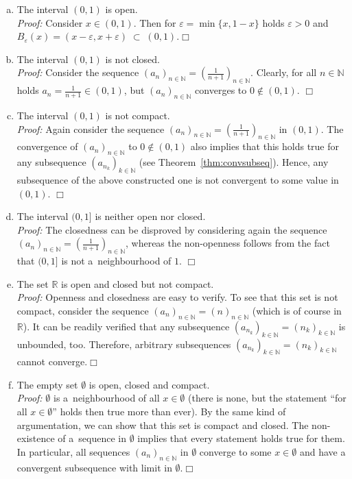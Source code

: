 \begin{example}
 \begin{enumerate}[(a)]
\item The interval $(0,1)$ is open. \\
{\em Proof:} Consider $x\in(0,1)$. Then for $\varepsilon=\min\{x,1-x\}$ holds $\varepsilon>0$ and \linebreak$B_\varepsilon(x)=(x-\varepsilon,x+\varepsilon)\;\subset\;(0,1)$.\hfill$\Box$
\item The interval $(0,1)$ is not closed.\\
{\em Proof:} Consider the sequence $(a_n)_{n\in\mathbb{N}}=(\frac1{n+1})_{n\in\mathbb{N}}$. Clearly, for all $n\in\mathbb{N}$ holds $a_n=\frac1{n+1}\in(0,1)$, but $(a_n)_{n\in\mathbb{N}}$ converges to $0\notin(0,1)$.
\hfill$\Box$
\item The interval $(0,1)$ is not compact.\\
{\em Proof:} Again consider the sequence $(a_n)_{n\in\mathbb{N}}=(\frac1{n+1})_{n\in\mathbb{N}}$ in $(0,1)$. The convergence of $(a_n)_{n\in\mathbb{N}}$ to $0\notin(0,1)$ also implies that this holds true for any subsequence $(a_{n_k})_{k\in\mathbb{N}}$ (see Theorem~\ref{thm:convsubseq}). Hence, any subsequence of the above constructed one is not convergent to some value in $(0,1)$.
\hfill$\Box$
\item The interval $(0,1]$ is neither open nor closed.\\
{\em Proof:} The closedness can be disproved by considering again the sequence \linebreak$(a_n)_{n\in\mathbb{N}}=(\frac1{n+1})_{n\in\mathbb{N}}$, whereas the non-openness follows from the fact that $(0,1]$ is not a~neighbourhood of $1$.
\hfill$\Box$
\item The set $\mathbb{R}$ is open and closed but not compact.\\
{\em Proof:} Openness and closedness are easy to verify. To see that this set is not compact, consider the sequence $(a_n)_{n\in\mathbb{N}}=(n)_{n\in\mathbb{N}}$ (which is of course in $\mathbb{R}$). It can be readily verified that any subsequence $(a_{n_k})_{k\in\mathbb{N}}=(n_k)_{k\in\mathbb{N}}$ is unbounded, too. Therefore, arbitrary subsequences $(a_{n_k})_{k\in\mathbb{N}}=(n_k)_{k\in\mathbb{N}}$ cannot converge.\hfill$\Box$
\item The empty set $\emptyset$ is open, closed and compact.\\
{\em Proof:}
$\emptyset$ is a~neighbourhood of all $x\in\emptyset$ (there is none, but the statement ``for all $x\in\emptyset$'' holds then true more than ever). By the same kind of argumentation, we can show that this set is compact and closed. The non-existence of a~sequence in $\emptyset$ implies that every statement holds true for them. In particular, all sequences $(a_{n})_{n\in\mathbb{N}}$ in $\emptyset$ converge to some $x\in\emptyset$ and have a convergent subsequence with limit in $\emptyset$.\hfill$\Box$
\end{enumerate}
\end{example}

